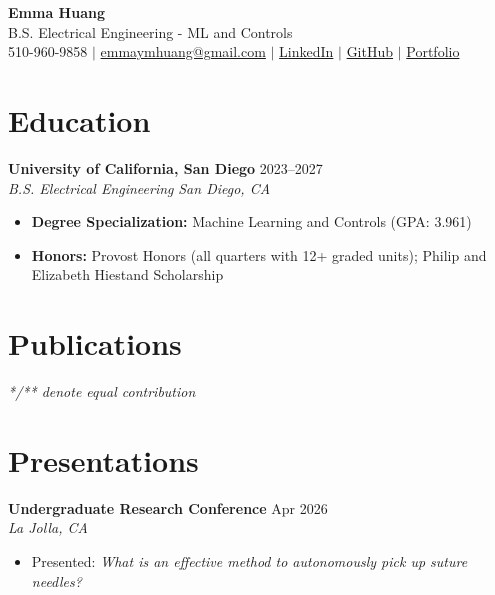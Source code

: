 \documentclass[11pt,a4paper]{article}
\newcommand{\resumeHeading}[4]{
  \vspace{0.15cm}
  \noindent\textbf{#1} \hfill #2 \\
  \noindent\textit{#3} \hfill \textit{#4} \par\vspace{0.1cm}
}
\newcommand{\resumeItem}[1]{
  \item\small{
    {#1 \vspace{-5pt}}
  }
}
\newcommand{\resumeItemListStart}{\begin{itemize}\vspace{-9pt}}
\newcommand{\resumeItemListEnd}{\end{itemize}\vspace{-5pt}}
\begin{document}
\begin{center}
    {\huge \textbf{Emma Huang}} \\ \vspace{0.2cm}
    B.S. Electrical Engineering - ML and Controls \\ \vspace{0.15cm}
    510-960-9858 $|$ \href{mailto:emmaymhuang@gmail.com}{emmaymhuang@gmail.com} $|$ \href{https://www.linkedin.com/in/emmahuang3815/}{LinkedIn} $|$ \href{https://github.com/emmah-3815}{GitHub} $|$ \href{https://docs.google.com/presentation/d/1wNdAtZ6k15xTbGFjD3lpOGhukgIPgvWrV_NMGGackeU/edit?usp=sharing}{Portfolio}
\end{center}

\section{Education}
\resumeHeading{University of California, San Diego}{2023--2027}{B.S. Electrical Engineering}{San Diego, CA}
\begin{itemize}[leftmargin=0.2in, itemsep=2pt, parsep=0pt, topsep=2pt]
    \item \textbf{Degree Specialization:} Machine Learning and Controls (GPA: 3.961)
    \item \textbf{Honors:} Provost Honors (all quarters with 12+ graded units); Philip and Elizabeth Hiestand Scholarship
\end{itemize}

\section{Publications}
\vspace{0.2em}
\textit{*/** denote equal contribution}
\nocite{*} %
\printbibliography[heading=none] %

\section{Presentations}
\resumeHeading{Undergraduate Research Conference}{Apr 2026}{}{La Jolla, CA}
\resumeItemListStart
    \resumeItem{Presented: \textit{What is an effective method to autonomously pick up suture needles?}}
\resumeItemListEnd
\end{document}
